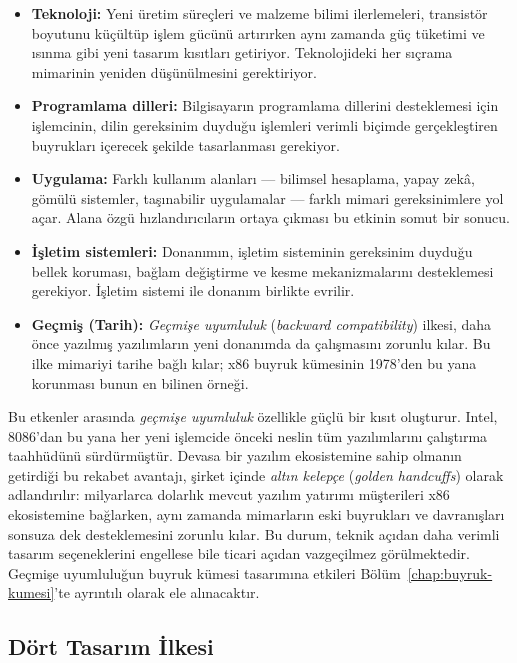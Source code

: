 \begin{itemize}
    \item \textbf{Teknoloji:} Yeni üretim süreçleri ve malzeme bilimi ilerlemeleri, transistör boyutunu küçültüp işlem gücünü artırırken aynı zamanda güç tüketimi ve ısınma gibi yeni tasarım kısıtları getiriyor. Teknolojideki her sıçrama mimarinin yeniden düşünülmesini gerektiriyor.
    \item \textbf{Programlama dilleri:} Bilgisayarın programlama dillerini desteklemesi için işlemcinin, dilin gereksinim duyduğu işlemleri verimli biçimde gerçekleştiren buyrukları içerecek şekilde tasarlanması gerekiyor.
    \item \textbf{Uygulama:} Farklı kullanım alanları --- bilimsel hesaplama, yapay zekâ, gömülü sistemler, taşınabilir uygulamalar --- farklı mimari gereksinimlere yol açar. Alana özgü hızlandırıcıların ortaya çıkması bu etkinin somut bir sonucu.
    \item \textbf{İşletim sistemleri:} Donanımın, işletim sisteminin gereksinim duyduğu bellek koruması, bağlam değiştirme ve kesme mekanizmalarını desteklemesi gerekiyor. İşletim sistemi ile donanım birlikte evrilir.
    \item \textbf{Geçmiş (Tarih):} \emph{Geçmişe uyumluluk} (\emph{backward compatibility}) ilkesi, daha önce yazılmış yazılımların yeni donanımda da çalışmasını zorunlu kılar. Bu ilke mimariyi tarihe bağlı kılar; x86 buyruk kümesinin 1978'den bu yana korunması bunun en bilinen örneği.
\end{itemize}

Bu etkenler arasında \emph{geçmişe uyumluluk} özellikle güçlü bir kısıt oluşturur. Intel, 8086'dan bu yana her yeni işlemcide önceki neslin tüm yazılımlarını çalıştırma taahhüdünü sürdürmüştür. Devasa bir yazılım ekosistemine sahip olmanın getirdiği bu rekabet avantajı, şirket içinde \emph{altın kelepçe} (\emph{golden handcuffs}) olarak adlandırılır: milyarlarca dolarlık mevcut yazılım yatırımı müşterileri x86 ekosistemine bağlarken, aynı zamanda mimarların eski buyrukları ve davranışları sonsuza dek desteklemesini zorunlu kılar. Bu durum, teknik açıdan daha verimli tasarım seçeneklerini engellese bile ticari açıdan vazgeçilmez görülmektedir. Geçmişe uyumluluğun buyruk kümesi tasarımına etkileri Bölüm~\ref{chap:buyruk-kumesi}'te ayrıntılı olarak ele alınacaktır.

\subsection{Dört Tasarım İlkesi}
\label{sec:tasarim-ilkeleri}

